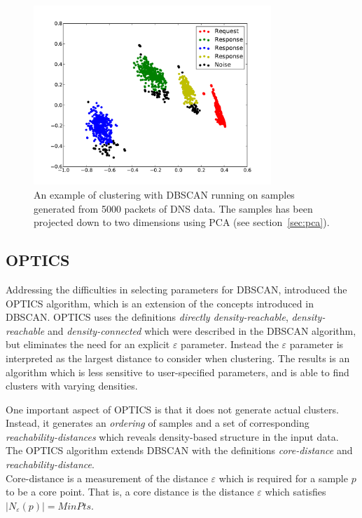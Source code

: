 \documentclass[a4paper]{report}
\begin{document}
\begin{figure}[h]
    \centering
    \includegraphics[width=0.8\textwidth]{dbscan_dns}
    \captionsetup{width=0.8\textwidth}
    \caption{An example of clustering with DBSCAN running on samples generated
    from 5000 packets of DNS data. The samples has been projected down to two
    dimensions using PCA (see section~\ref{sec:pca}).}
    \label{fig:dbscan}
\end{figure}

\subsection{OPTICS}
Addressing the difficulties in selecting parameters for DBSCAN,
\citet{ankerst99} introduced the OPTICS algorithm, which is an extension of
the concepts introduced in DBSCAN. OPTICS uses the definitions
\emph{directly density-reachable}, \emph{density-reachable} and
\emph{density-connected} which were described in the DBSCAN algorithm, but
eliminates the need for an explicit $\varepsilon$ parameter. Instead the
$\varepsilon$ parameter is interpreted as the largest distance to consider
when clustering. The results is an algorithm which is less sensitive to
user-specified parameters, and is able to find clusters with varying densities.

One important aspect of OPTICS is that it does not generate actual clusters.
Instead, it generates an \emph{ordering} of samples and a set of corresponding
\emph{reachability-distances} which reveals density-based structure in the
input data. The OPTICS algorithm extends DBSCAN with the definitions
\emph{core-distance} and \emph{reachability-distance}.
\\[0.5cm]
Core-distance is a measurement of the distance $\varepsilon$ which is required
for a sample $p$ to be a core point. That is, a core distance is the distance
$\varepsilon$ which satisfies $|N_{\varepsilon}(p)| = MinPts$.
\end{document}
